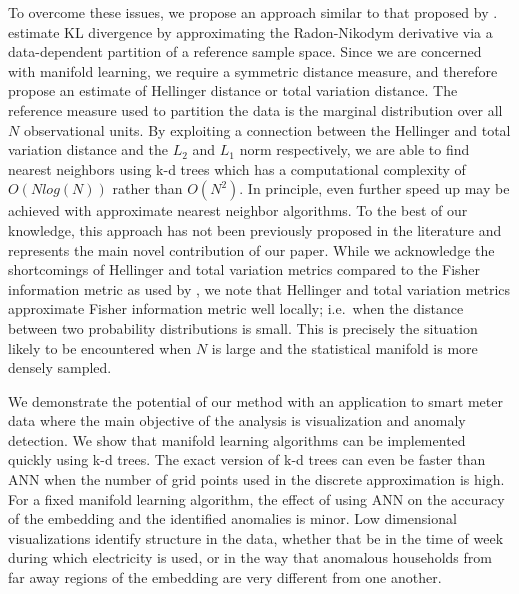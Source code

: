 \documentclass{article}
\begin{document}
To overcome these issues, we propose an approach similar to that
proposed by \citet{Wang2005-zs}. \citet{Wang2005-zs} estimate KL
divergence by approximating the Radon-Nikodym derivative via a
data-dependent partition of a reference sample space. Since we are
concerned with manifold learning, we require a symmetric distance
measure, and therefore propose an estimate of Hellinger distance or
total variation distance. The reference measure used to partition the
data is the marginal distribution over all \(N\) observational units. By
exploiting a connection between the Hellinger and total variation
distance and the \(L_2\) and \(L_1\) norm respectively, we are able to
find nearest neighbors using k-d trees which has a computational
complexity of \(O(Nlog(N))\) rather than \(O(N^2)\). In principle, even
further speed up may be achieved with approximate nearest neighbor
algorithms. To the best of our knowledge, this approach has not been
previously proposed in the literature and represents the main novel
contribution of our paper. While we acknowledge the shortcomings of
Hellinger and total variation metrics compared to the Fisher information
metric as used by \citet{Carter2009-ti}, we note that Hellinger and
total variation metrics approximate Fisher information metric well
locally; i.e.~when the distance between two probability distributions is
small. This is precisely the situation likely to be encountered when
\(N\) is large and the statistical manifold is more densely sampled.

We demonstrate the potential of our method with an application to smart
meter data where the main objective of the analysis is visualization and
anomaly detection. We show that manifold learning algorithms can be
implemented quickly using k-d trees. The exact version of k-d trees can
even be faster than ANN when the number of grid points used in the
discrete approximation is high. For a fixed manifold learning algorithm,
the effect of using ANN on the accuracy of the embedding and the
identified anomalies is minor. Low dimensional visualizations identify
structure in the data, whether that be in the time of week during which
electricity is used, or in the way that anomalous households from far
away regions of the embedding are very different from one another.
\end{document}
